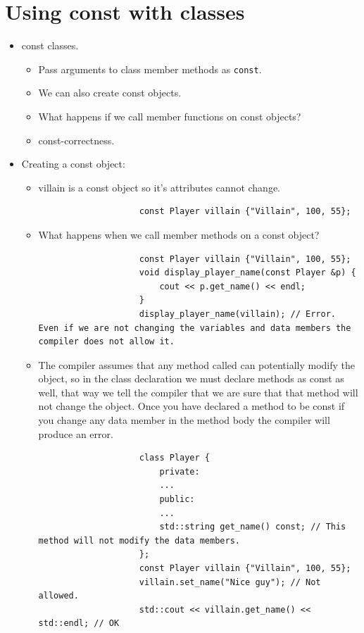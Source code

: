 \section{Using const with classes}
\begin{itemize}
    \item const classes.
        \begin{itemize}
            \item Pass arguments to class member methods as \texttt{const}.
            \item We can also create const objects.
            \item What happens if we call member functions on const objects?
            \item const-correctness. 
        \end{itemize}
    
    \item Creating a const object:
        \begin{itemize}
            \item villain is a const object so it's attributes cannot change.
                \begin{verbatim}
                    const Player villain {"Villain", 100, 55};
                \end{verbatim}
            
            \item What happens when we call member methods on a const object?
                \begin{verbatim}
                    const Player villain {"Villain", 100, 55};
                    void display_player_name(const Player &p) {
                        cout << p.get_name() << endl;
                    }
                    display_player_name(villain); // Error. Even if we are not changing the variables and data members the compiler does not allow it.
                \end{verbatim}
            
            \item The compiler assumes that any method called can potentially modify the object, so in the class declaration we must declare methods as const as well, that way we tell the compiler that we are sure that that method will not change the object. Once you have declared a method to be const if you change any data member in the method body the compiler will produce an error.
                \begin{verbatim}
                    class Player {
                        private:
                        ...
                        public: 
                        ...
                        std::string get_name() const; // This method will not modify the data members.
                    };
                    const Player villain {"Villain", 100, 55}; 
                    villain.set_name("Nice guy"); // Not allowed.
                    std::cout << villain.get_name() << std::endl; // OK
                \end{verbatim}
        \end{itemize}
\end{itemize}

